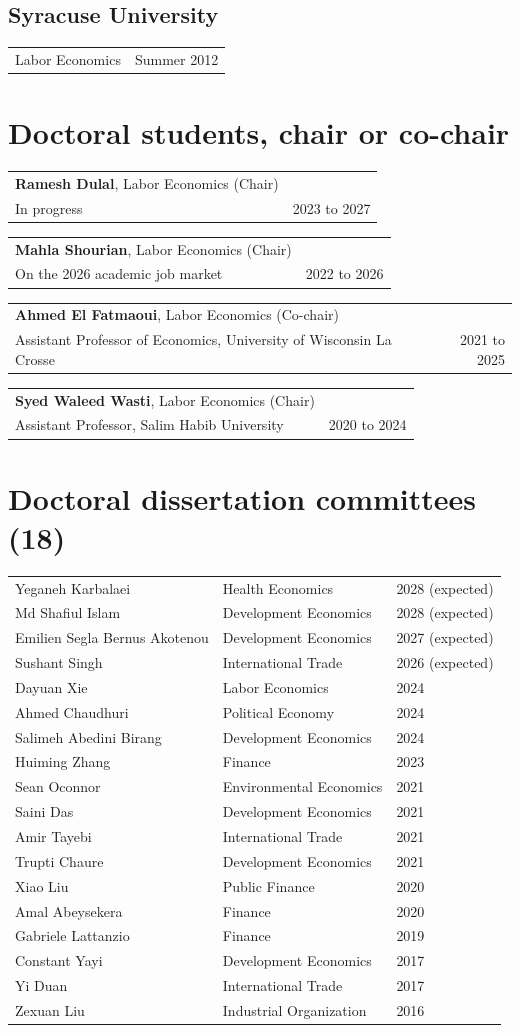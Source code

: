 \documentclass[10.5pt]{article}
\makeatletter
\newcommand{\cvrow}[2]{\noindent\begin{tabularx}{\textwidth}{@{}X r@{}} #1 & {\small\color{gray} #2} \end{tabularx}\par}
\makeatother
\begin{document}
\subsection{Syracuse University}
\cvrow{Labor Economics}{Summer 2012}
\section{Doctoral students, chair or co-chair}
\cvrow{\textbf{Ramesh Dulal}, Labor Economics (Chair)\\ {\small In progress}}{2023 to 2027}
\cvrow{\textbf{Mahla Shourian}, Labor Economics (Chair)\\ {\small On the 2026 academic job market}}{2022 to 2026}
\cvrow{\textbf{Ahmed El Fatmaoui}, Labor Economics (Co-chair)\\ {\small Assistant Professor of Economics, University of Wisconsin La Crosse}}{2021 to 2025}
\cvrow{\textbf{Syed Waleed Wasti}, Labor Economics (Chair)\\ {\small Assistant Professor, Salim Habib University}}{2020 to 2024}
\section{Doctoral dissertation committees (18)}
\begin{longtable}{@{}p{} p{} p{}@{}}
Yeganeh Karbalaei & Health Economics & 2028 (expected) \\
Md Shafiul Islam & Development Economics & 2028 (expected) \\
Emilien Segla Bernus Akotenou & Development Economics & 2027 (expected) \\
Sushant Singh & International Trade & 2026 (expected) \\
Dayuan Xie & Labor Economics & 2024 \\
Ahmed Chaudhuri & Political Economy & 2024 \\
Salimeh Abedini Birang & Development Economics & 2024 \\
Huiming Zhang & Finance & 2023 \\
Sean Oconnor & Environmental Economics & 2021 \\
Saini Das & Development Economics & 2021 \\
Amir Tayebi & International Trade & 2021 \\
Trupti Chaure & Development Economics & 2021 \\
Xiao Liu & Public Finance & 2020 \\
Amal Abeysekera & Finance & 2020 \\
Gabriele Lattanzio & Finance & 2019 \\
Constant Yayi & Development Economics & 2017 \\
Yi Duan & International Trade & 2017 \\
Zexuan Liu & Industrial Organization & 2016 \\
\end{longtable}
\end{document}
